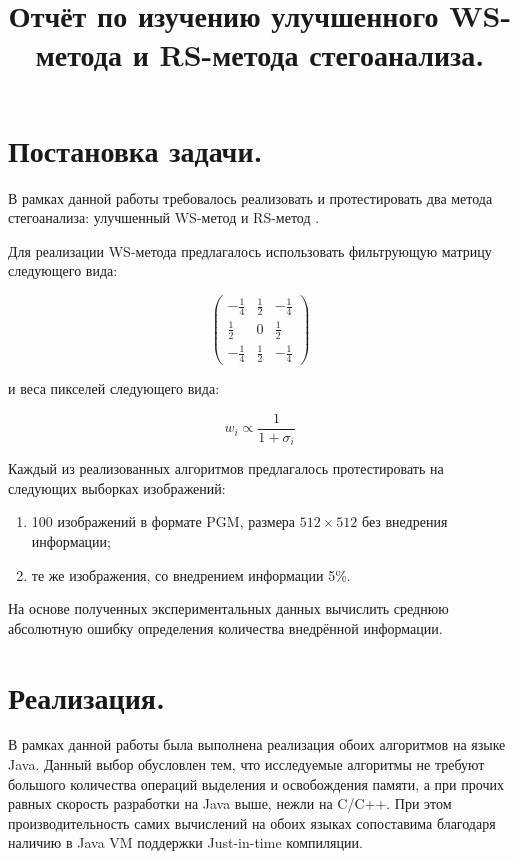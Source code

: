 \documentclass[12pt,a4paper,russian,numbers=endperiod]{scrartcl}
\title{Отчёт по изучению улучшенного WS-метода и RS-метода стегоанализа.}
\begin{document}
\maketitle



\section{Постановка задачи.}

В рамках данной работы требовалось реализовать и протестировать два метода стегоанализа: улучшенный WS-метод \cite{ker} и RS-метод \cite{fridrich}.

Для реализации WS-метода предлагалось использовать фильтрующую матрицу следующего вида:

\begin{equation*}
\begin{pmatrix}
-\frac{1}{4}	& \frac{1}{2}	& -\frac{1}{4}\\
\frac{1}{2}		& 0				& \frac{1}{2}\\
-\frac{1}{4}	& \frac{1}{2}	& -\frac{1}{4}
\end{pmatrix}
\end{equation*}

\noindent и веса пикселей следующего вида:

\begin{equation*}
w_i \propto \frac{1}{1+\sigma{}_i}
\end{equation*}

Каждый из реализованных алгоритмов предлагалось протестировать на следующих выборках изображений:

\begin{enumerate}
	\item 100 изображений в формате PGM, размера $512\times{}512$ без внедрения информации;
	\item те же изображения, со внедрением информации 5\%.
\end{enumerate}

На основе полученных экспериментальных данных вычислить среднюю абсолютную ошибку определения количества внедрённой информации.

\section{Реализация.}

В рамках данной работы была выполнена реализация обоих алгоритмов на языке Java. Данный  выбор обусловлен тем, что исследуемые алгоритмы не требуют большого количества операций выделения и освобождения памяти, а при прочих равных скорость разработки на Java выше, нежли на C/C++. При этом производительность самих вычислений на обоих языках сопоставима благодаря наличию в Java VM поддержки Just-in-time компиляции.
\end{document}
